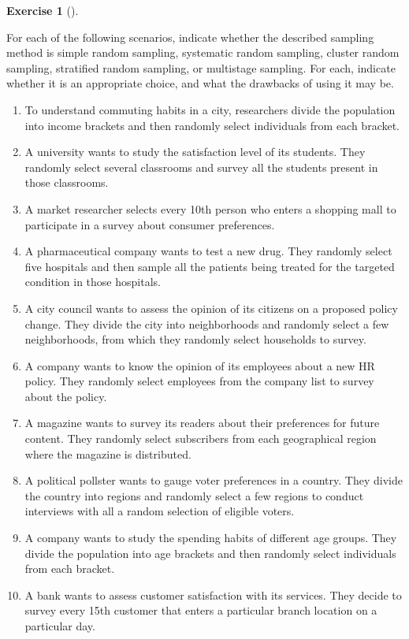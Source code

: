 \documentclass[
  letterpaper,
  DIV=11,
  numbers=noendperiod]{scrreprt}
\providecommand{\tightlist}{%
  \setlength{\itemsep}{0pt}\setlength{\parskip}{0pt}}\usepackage{longtable,booktabs,array}
\theoremstyle{definition}
\newtheorem{exercise}{Exercise}[chapter]
\theoremstyle{definition}
\theoremstyle{definition}
\theoremstyle{remark}
\begin{document}
\begin{exercise}[]\protect\hypertarget{exr-10.6}{}\label{exr-10.6}

For each of the following scenarios, indicate whether the described
sampling method is simple random sampling, systematic random sampling,
cluster random sampling, stratified random sampling, or multistage
sampling. For each, indicate whether it is an appropriate choice, and
what the drawbacks of using it may be.

\begin{enumerate}
\def\labelenumi{\alph{enumi}.}
\tightlist
\item
  To understand commuting habits in a city, researchers divide the
  population into income brackets and then randomly select individuals
  from each bracket.
\item
  A university wants to study the satisfaction level of its students.
  They randomly select several classrooms and survey all the students
  present in those classrooms.
\item
  A market researcher selects every 10th person who enters a shopping
  mall to participate in a survey about consumer preferences.
\item
  A pharmaceutical company wants to test a new drug. They randomly
  select five hospitals and then sample all the patients being treated
  for the targeted condition in those hospitals.
\item
  A city council wants to assess the opinion of its citizens on a
  proposed policy change. They divide the city into neighborhoods and
  randomly select a few neighborhoods, from which they randomly select
  households to survey.
\item
  A company wants to know the opinion of its employees about a new HR
  policy. They randomly select employees from the company list to survey
  about the policy.
\item
  A magazine wants to survey its readers about their preferences for
  future content. They randomly select subscribers from each
  geographical region where the magazine is distributed.
\item
  A political pollster wants to gauge voter preferences in a country.
  They divide the country into regions and randomly select a few regions
  to conduct interviews with all a random selection of eligible voters.
\item
  A company wants to study the spending habits of different age groups.
  They divide the population into age brackets and then randomly select
  individuals from each bracket.
\item
  A bank wants to assess customer satisfaction with its services. They
  decide to survey every 15th customer that enters a particular branch
  location on a particular day.
\end{enumerate}

\end{exercise}
\end{document}
